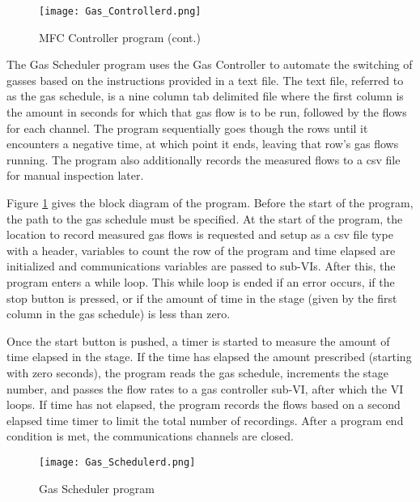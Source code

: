 \begin{landscape}
        \begin{figure}\ContinuedFloat
            \begin{center}
            \texttt{[image: Gas\_Controllerd.png]}
            \end{center}
            \caption[]{MFC Controller program (cont.)}
        \end{figure}%
    \end{landscape}

    The Gas Scheduler program uses the Gas Controller to automate the switching of gasses based on the instructions provided in a text file.
    The text file, referred to as the gas schedule, is a nine column tab delimited file where the first column is the amount in seconds for which that gas flow is to be run, followed by the flows for each channel.
    The program sequentially goes though the rows until it encounters a negative time, at which point it ends, leaving that row's gas flows running.
    The program also additionally records the measured flows to a \gls{csv} file for manual inspection later.

    Figure \ref{fig:gasschedvi} gives the block diagram of the program.
    Before the start of the program, the path to the gas schedule must be specified.
    At the start of the program, the location to record measured gas flows is requested and setup as a \gls{csv} file type with a header, variables to count the row of the program and time elapsed are initialized and communications variables are passed to sub-VIs.
    After this, the program enters a while loop.
    This while loop is ended if an error occurs, if the stop button is pressed, or if the amount of time in the stage (given by the first column in the gas schedule) is less than zero.

    Once the start button is pushed, a timer is started to measure the amount of time elapsed in the stage.
    If the time has elapsed the amount prescribed (starting with zero seconds), the program reads the gas schedule, increments the stage number, and passes the flow rates to a gas controller sub-VI, after which the VI loops.
    If time has not elapsed, the program records the flows based on a second elapsed time timer to limit the total number of recordings.
    After a program end condition is met, the communications channels are closed.

    \begin{landscape}%
        \begin{figure}
            \begin{center}
            \texttt{[image: Gas\_Schedulerd.png]}
            \end{center}
            \caption{Gas Scheduler program}
            \label{fig:gasschedvi}
        \end{figure}
    \end{landscape}

